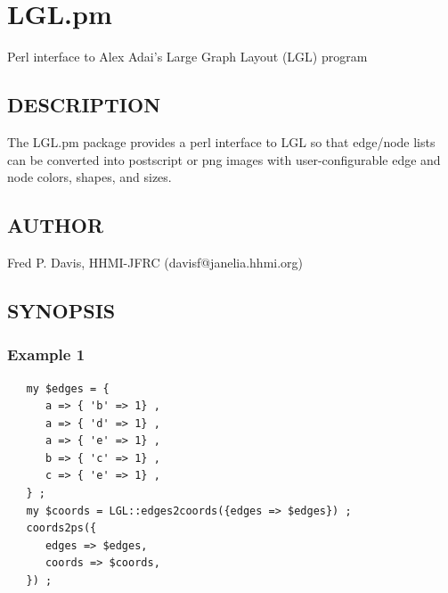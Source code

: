 \documentclass{article}
\begin{document}

\clearpage
\section{LGL.pm\label{LGL_pm}}


Perl interface to Alex Adai's Large Graph Layout (LGL) program

\subsection*{DESCRIPTION\label{LGL_pm_DESCRIPTION}}


The LGL.pm package provides a perl interface to LGL so that edge/node lists can
be converted into postscript or png images with user-configurable edge and node
colors, shapes, and sizes.

\subsection*{AUTHOR\label{LGL_pm_AUTHOR}}


Fred P. Davis, HHMI-JFRC (davisf@janelia.hhmi.org)

\subsection*{SYNOPSIS\label{LGL_pm_SYNOPSIS}}
\subsubsection*{Example 1\label{LGL_pm_Example_1}}
\begin{verbatim}
   my $edges = {
      a => { 'b' => 1} ,
      a => { 'd' => 1} ,
      a => { 'e' => 1} ,
      b => { 'c' => 1} ,
      c => { 'e' => 1} ,
   } ;
   my $coords = LGL::edges2coords({edges => $edges}) ;
   coords2ps({
      edges => $edges,
      coords => $coords,
   }) ;
\end{verbatim}
\end{document}
